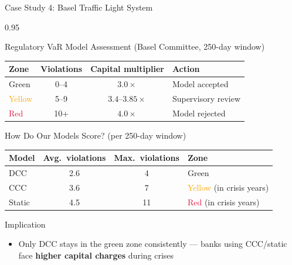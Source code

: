 \documentclass[9pt, aspectratio=169, t]{beamer}
\begin{document}
\begin{frame}{Case Study 4: Basel Traffic Light System}
    \begin{cminipage}{0.95\textwidth}
    {\footnotesize
    \begin{block}{Regulatory VaR Model Assessment (Basel Committee, 250-day window)}
        {\small
        \begin{center}
        \begin{tabular}{l|c|c|l}
            \hline
            \textbf{Zone} & \textbf{Violations} & \textbf{Capital multiplier} & \textbf{Action} \\
            \hline
            \textcolor{Forest}{Green}  & 0--4  & $3.0\times$ & Model accepted \\
            \textcolor{orange}{Yellow} & 5--9  & $3.4$--$3.85\times$ & Supervisory review \\
            \textcolor{Crimson}{Red}   & 10+   & $4.0\times$ & Model rejected \\
            \hline
        \end{tabular}
        \end{center}
        }
    \end{block}
    \vspace{-2mm}
    \begin{block}{How Do Our Models Score? (per 250-day window)}
        {\small
        \begin{center}
        \begin{tabular}{l|c|c|l}
            \hline
            \textbf{Model} & \textbf{Avg.\ violations} & \textbf{Max.\ violations} & \textbf{Zone} \\
            \hline
            DCC    & 2.6 & 4  & \textcolor{Forest}{Green} \\
            CCC    & 3.6 & 7  & \textcolor{orange}{Yellow} (in crisis years) \\
            Static & 4.5 & 11 & \textcolor{Crimson}{Red} (in crisis years) \\
            \hline
        \end{tabular}
        \end{center}
        }
    \end{block}
    \vspace{-2mm}
    \begin{alertblock}{Implication}
        \begin{itemize}\setlength{\itemsep}{0pt}
            \item Only DCC stays in the \textcolor{Forest}{green zone} consistently --- banks using CCC/static face \textbf{higher capital charges} during crises
        \end{itemize}
    \end{alertblock}
    }
    \end{cminipage}
\end{frame}
\end{document}
